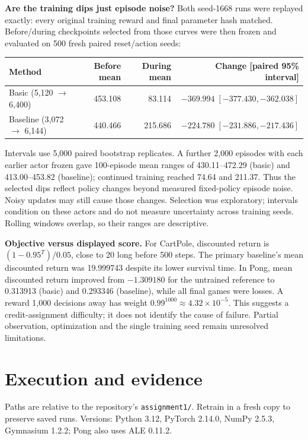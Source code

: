 \documentclass[11pt,letterpaper]{article}
\begin{document}
\textbf{Are the training dips just episode noise?} Both seed-1668 runs were replayed exactly: every original training reward and final parameter hash matched. Before/during checkpoints selected from those curves were then frozen and evaluated on 500 fresh paired reset/action seeds:
\begin{center}\small
\begin{tabular}{lrrr}\toprule
Method & Before mean & During mean & Change [paired 95\% interval]\\\midrule
Basic (5,120 $\to$ 6,400) & 453.108 & 83.114 & $-369.994\;[-377.430,-362.038]$\\
Baseline (3,072 $\to$ 6,144) & 440.466 & 215.686 & $-224.780\;[-231.886,-217.436]$\\\bottomrule
\end{tabular}\end{center}
Intervals use 5,000 paired bootstrap replicates. A further 2,000 episodes with each earlier actor frozen gave 100-episode mean ranges of 430.11--472.29 (basic) and 413.00--453.82 (baseline); continued training reached 74.64 and 211.37. Thus the selected dips reflect policy changes beyond measured fixed-policy episode noise. Noisy updates may still cause those changes. Selection was exploratory; intervals condition on these actors and do not measure uncertainty across training seeds. Rolling windows overlap, so their ranges are descriptive.

\textbf{Objective versus displayed score.} For CartPole, discounted return is $(1-0.95^T)/0.05$, close to 20 long before 500 steps. The primary baseline's mean discounted return was 19.999743 despite its lower survival time. In Pong, mean discounted return improved from $-1.309180$ for the untrained reference to 0.313913 (basic) and 0.293346 (baseline), while all final games were losses. A reward 1,000 decisions away has weight $0.99^{1000}\approx4.32\times10^{-5}$. This suggests a credit-assignment difficulty; it does not identify the cause of failure. Partial observation, optimization and the single training seed remain unresolved limitations.

\clearpage
\section{Execution and evidence}
Paths are relative to the repository's \texttt{assignment1/}. Retrain in a fresh copy to preserve saved runs. Versions: Python 3.12, PyTorch 2.14.0, NumPy 2.5.3, Gymnasium 1.2.2; Pong also uses ALE 0.11.2.
\end{document}

